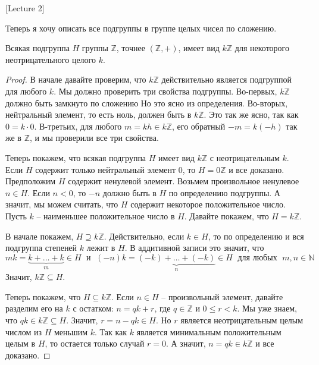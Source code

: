 [Lecture 2]


Теперь я хочу описать все подгруппы в группе целых чисел по сложению.

\begin{claim}
\label{claim::Zsubgroups}
Всякая подгруппа $H$ группы $\mathbb Z$, точнее $(\mathbb Z, +)$, имеет вид $k\mathbb Z$ для некоторого неотрицательного целого $k$.
\end{claim}
\begin{proof}
В начале давайте проверим, что $k \mathbb Z$ действительно является подгруппой для любого $k$.
Мы должно проверить три свойства подгруппы.
Во-первых, $k\mathbb Z$ должно быть замкнуто по сложению
Но это ясно из определения.
Во-вторых, нейтральный элемент, то есть ноль, должен быть в $k\mathbb Z$.
Это так же ясно, так как $0 = k \cdot 0$.
В-третьих, для любого $m = kh \in k\mathbb Z$, его обратный $-m= k(-h)$ так же в $\mathbb Z$, и мы проверили все три свойства.

Теперь покажем, что всякая подгруппа $H$ имеет вид $k \mathbb Z$ с неотрицательным $k$.
Если $H$ содержит только нейтральный элемент $0$,  то $H = 0\mathbb Z$ и все доказано.
Предположим $H$ содержит ненулевой элемент.
Возьмем произвольное ненулевое $n \in H$.
Если $n < 0$, то $-n$ должно быть в $H$ по определению подгруппы.
А значит, мы можем считать, что $H$ содержит некоторое положительное число.
Пусть $k$ -- наименьшее положительное число в $H$.
Давайте покажем, что $H = k \mathbb Z$.

В начале покажем, $H \supseteq k \mathbb Z$.
Действительно, если $k\in H$, то по определению и вся подгруппа степеней $k$ лежит в $H$.
В аддитивной записи это значит, что
\[
mk  = \underbrace{k + \ldots + k}_m \in H\;\text{ и }\;(-n)k=\underbrace{(-k) + \ldots + (-k)}_n\in H\; \text{ для любых }\;m, n\in \mathbb N
\]
Значит, $k\mathbb Z\subseteq H$.

Теперь покажем, что $H\subseteq k\mathbb Z$.
Если $n\in H$ -- произвольный элемент, давайте разделим его на $k$ с остатком: $n = q k + r$, где $q\in \mathbb Z$ и $0 \leqslant r < k$.
Мы уже знаем, что $qk \in k\mathbb Z\subseteq H$.
Значит, $r = n - qk \in H$.
Но $r$ является неотрицательным целым числом из $H$ меньшим $k$.
Так как $k$ является минимальным положительным целым в $H$, то остается только случай $r = 0$.
А значит, $n = qk\in k\mathbb Z$ и все доказано.
\end{proof}

